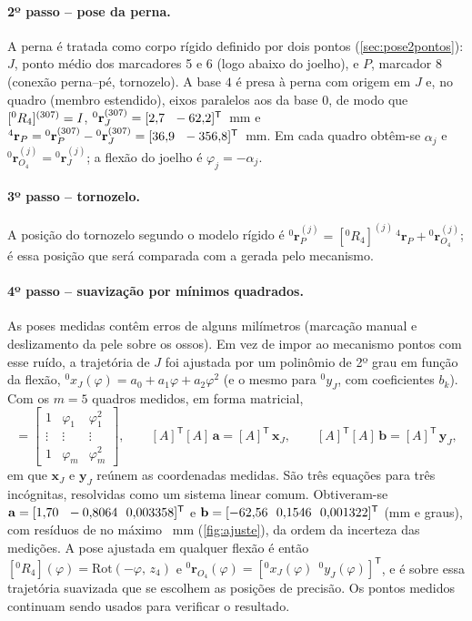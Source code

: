 \documentclass[12pt,a4paper,twoside]{article}
\newcommand{\rv}[2]{{}^{#1}\mathbf{r}_{#2}}          %
\newcommand{\Rm}[2]{[{}^{#1}R_{#2}]}                 %
\newcommand{\Rot}[2]{\mathrm{Rot}(#1,\,#2)}
\numberwithin{equation}{section}
\begin{document}
\paragraph{2º passo -- pose da perna.} A perna é tratada como corpo rígido definido por dois
pontos (\cref{sec:pose2pontos}): $J$, ponto médio dos marcadores 5 e 6 (logo abaixo do
joelho), e $P$, marcador 8 (conexão perna--pé, tornozelo). A base $4$ é presa à perna com
origem em $J$ e, no quadro \frRef{} (membro estendido), eixos paralelos aos da base $0$, de
modo que $\Rm{0}{4}^{(\frRef)} = I$, $\rv{0}{J}^{(\frRef)} = [\Jx\ \ \Jy]^{\mathsf T}$~mm e
$\rv{4}{P} = \rv{0}{P}^{(\frRef)} - \rv{0}{J}^{(\frRef)} = [\Px\ \ \Py]^{\mathsf T}$~mm. Em cada quadro obtêm-se
$\alpha_j$ e $\rv{0}{O_4}^{(j)} = \rv{0}{J}^{(j)}$; a flexão do joelho é $\varphi_j = -\alpha_j$.

\paragraph{3º passo -- tornozelo.} A posição do tornozelo segundo o modelo rígido é
$\rv{0}{P}^{(j)} = \Rm{0}{4}^{(j)}\,\rv{4}{P} + \rv{0}{O_4}^{(j)}$; é essa posição que será comparada com a
gerada pelo mecanismo.

\paragraph{4º passo -- suavização por mínimos quadrados.} As poses medidas contêm erros de
alguns milímetros (marcação manual e deslizamento da pele sobre os ossos). Em vez de impor ao
mecanismo pontos com esse ruído, a trajetória de $J$ foi ajustada por um polinômio de 2º grau
em função da flexão, ${}^0x_J(\varphi) = a_0 + a_1\varphi + a_2\varphi^2$ (e o mesmo para
${}^0y_J$, com coeficientes $b_k$). Com os $m = 5$ quadros medidos, em forma matricial,
\begin{equation}
  [A] = \begin{bmatrix} 1 & \varphi_1 & \varphi_1^2 \\ \vdots & \vdots & \vdots \\ 1 & \varphi_m & \varphi_m^2 \end{bmatrix},
  \qquad
  [A]^{\mathsf T}[A]\,\mathbf a = [A]^{\mathsf T}\,\mathbf x_J ,
  \qquad
  [A]^{\mathsf T}[A]\,\mathbf b = [A]^{\mathsf T}\,\mathbf y_J ,
  \label{eq:minquad}
\end{equation}
em que $\mathbf x_J$ e $\mathbf y_J$ reúnem as coordenadas medidas. São três equações para três
incógnitas, resolvidas como um sistema linear comum. Obtiveram-se
$\mathbf a = [1{,}70\ \ -0{,}8064\ \ 0{,}003358]^{\mathsf T}$ e $\mathbf b = [\cyZero\ \ \cyUm\ \ \cyDois]^{\mathsf T}$
(mm e graus), com resíduos de no máximo \resmax~mm (\cref{fig:ajuste}), da ordem da incerteza
das medições. A pose ajustada em qualquer flexão é então
$\Rm{0}{4}(\varphi) = \Rot{-\varphi}{z_4}$ e $\rv{0}{O_4}(\varphi) = [{}^0x_J(\varphi)\ \ {}^0y_J(\varphi)]^{\mathsf T}$, e é sobre
essa trajetória suavizada que se escolhem as posições de precisão. Os pontos medidos
continuam sendo usados para verificar o resultado.
\end{document}
